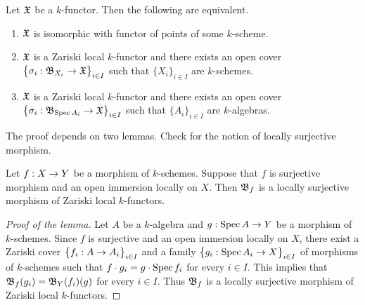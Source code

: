 \begin{theorem}\label{theorem:representabilitybasicresult}
Let ${\mathfrak X}$ be a $k$-functor. Then the following are equivalent.
\begin{enumerate}[label=\emph{\textbf{(\roman*)}}, leftmargin=1.5em]
\item ${\mathfrak X}$ is isomorphic with functor of points of some $k$-scheme.
\item ${\mathfrak X}$ is a Zariski local $k$-functor and there exists an open cover $\big\{\sigma_i:{\mathfrak B}_{X_i}\rightarrow {\mathfrak X}\big\}_{i\in I}$ such that $\{X_i\}_{i\in I}$ are $k$-schemes.
\item ${\mathfrak X}$ is a Zariski local $k$-functor and there exists an open cover $\big\{\sigma_i:{\mathfrak B}_{\mathrm{Spec}\, A_i}\rightarrow {\mathfrak X}\big\}_{i\in I}$ such that $\{A_i\}_{i\in I}$ are $k$-algebras.
\end{enumerate}
\end{theorem}
\noindent
The proof depends on two lemmas. Check {\cite[Definition 7.1]{Sheaves}} for the notion of locally surjective morphism.

\begin{lemma}\label{lemma:openimmersionslocallyondomainarezariskilocalkfunctors}
Let $f:X\rightarrow Y$ be a morphism of $k$-schemes. Suppose that $f$ is surjective morphism and an open immersion locally on $X$. Then ${\mathfrak B}_f$ is a locally surjective morphism of Zariski local $k$-functors. 
\end{lemma}
\begin{proof}[Proof of the lemma]
Let $A$ be a $k$-algebra and $g:\mathrm{Spec}\, A\rightarrow Y$ be a morphism of $k$-schemes. Since $f$ is surjective and an open immersion locally on $X$, there exist a Zariski cover $\big\{f_i:A\rightarrow A_i\big\}_{i\in I}$ and a family $\big\{g_i:\mathrm{Spec}\, A_i\rightarrow X\big\}_{i\in I}$ of morphisms of $k$-schemes such that $f\cdot g_i = g\cdot \mathrm{Spec}\, f_i$ for every $i\in I$. This implies that ${\mathfrak B}_f(g_i) = {\mathfrak B}_Y(f_i)(g)$ for every $i\in I$. Thus ${\mathfrak B}_f$ is a locally surjective morphism of Zariski local $k$-functors.
\end{proof}

